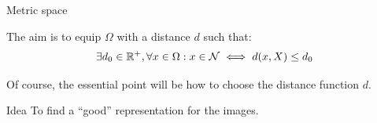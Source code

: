 \documentclass[xcolor=pdftex,dvipsnames,table,mathserif]{beamer}
\begin{document}
\begin{frame}{Metric space}

  The aim is to equip $\Omega$ with a distance $d$ such that:
  \[
  \exists d_0 \in \mathbb{R}^+,  \forall x \in \Omega: x \in \mathcal{N} \iff d(x, X) \leq d_0
  \]

  Of course, the essential point will be how to choose the distance function $d$.

  \begin{block}{Idea}
    To find a ``good'' representation for the images.
  \end{block}


\end{frame}



\end{document}
